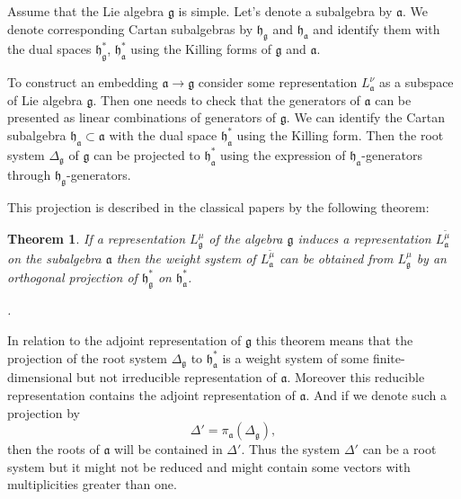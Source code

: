 \documentclass[12pt]{article}
\newtheorem{theorem}{Theorem}
\newcommand{\pia}{\pi_{\mathfrak{a}}}
\newcommand{\gf}{\mathfrak{g}}
\newcommand{\af}{\mathfrak{a}}
\newcommand{\hf}{\mathfrak{h}}
\newcommand{\hfg}{\hf_{\gf}}
\newcommand{\hfa}{\hf_{\af}}
\begin{document}
Assume that the Lie algebra $\gf$ is simple. Let's denote a subalgebra by
$\af$. We denote corresponding Cartan subalgebras by $\hfg$ and $\hfa$ and identify them with the dual
spaces $\hfg^{*}$, $\hfa^{*}$ using the Killing forms of $\gf$ and $\af$.

To construct an embedding $\af\to\gf$ consider some representation $L^{\nu}_{\af}$ as a subspace of
Lie algebra $\gf$. Then one needs to check that the generators of $\af$ can be presented as
linear combinations of generators of $\gf$. We can identify the Cartan subalgebra $\hfa\subset \af$ with
the dual space $\hfa^{*}$ using the Killing form. Then the root system $\Delta_{\gf}$ of $\gf$ can be
projected to $\hfa^{*}$ using the expression of $\hfa$-generators through $\hfg$-generators.


This projection is described in the classical papers \cite{dynkin1952semisimple,dynkin1952maximal} by the following theorem:

\begin{theorem}\label{dyn0}
  If a representation $L^{\mu}_{\gf}$ of the algebra $\gf$ induces a representation
  $L^{\tilde\mu}_{\af}$ on the subalgebra $\af$ then the weight system of $L^{\tilde\mu}_{\af}$ can
  be obtained from $L^{\mu}_{\gf}$ by an orthogonal projection of $\hfg^{*}$ on $\hfa^{*}$.

  \cite{dynkin1952maximal}. 
\end{theorem} 

In relation to the adjoint representation of $\gf$ this theorem means that the projection of the root system $\Delta_{\gf}$ to $\hfa^{*}$ is a weight system of some
finite-dimensional but not irreducible representation of $\af$. Moreover this reducible representation contains the adjoint representation of $\af$. And if we denote such a projection by
\begin{equation}
  \label{eq:2}
  \Delta'=\pia\left(\Delta_{\gf}\right),
\end{equation}
then the roots of $\af$ will be contained in $\Delta'$. Thus the system $\Delta'$ can be a root
system but it might not be reduced and might contain some vectors with multiplicities greater than
one.
\end{document}
